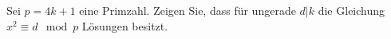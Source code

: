 
\begin{exercise}

Sei $p = 4k + 1$ eine Primzahl. Zeigen Sie, dass für ungerade $d|k$ die
Gleichung $x^2 \equiv d \mod{p}$ Lösungen besitzt.

\end{exercise}


\begin{solution}

\phantom{}

\end{solution}

